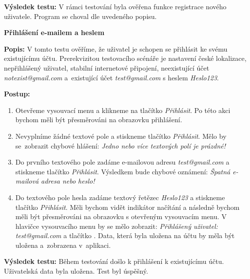 \documentclass[czech, bc, kiv, he, iso690numb]{fasthesis}
\begin{document}
\noindent \textbf{Výsledek testu:} V rámci testování byla ověřena funkce registrace nového uživatele. Program se choval dle uvedeného popisu.

\vspace{0.1cm}


\noindent \textbf{Přihlášení e-mailem a heslem}

\vspace{0.1cm}

\noindent \textbf{Popis:} V tomto testu ověříme, že uživatel je schopen se přihlásit ke svému existujícímu účtu. Prerekvizitou testovacího scénáře je nastavení české lokalizace, nepřihlášený uživatel, stabilní internetové připojení, neexistující účet \textit{notexist@gmail.com} a~existující účet \textit{test@gmail.com} s heslem \textit{Heslo123}.

\vspace{0.1cm}

\noindent \textbf{Postup:}

\begin{enumerate}[label=\arabic*., itemsep=0pt, topsep=0pt, parsep=0pt]
    \item Otevřeme vysouvací menu a klikneme na tlačítko \textit{Přihlásit}. Po této akci bychom měli být přesměrováni na obrazovku přihlášení.
    \item Nevyplníme žádné textové pole a stiskneme tlačítko \textit{Přihlásit}. Mělo by se~zobrazit chybové hlášení: \textit{Jedno nebo více textových polí je prázdné!}
    \item Do prvního textového pole zadáme e-mailovou adresu \textit{test@gmail.com} a stiskneme tlačítko \textit{Přihlásit}. Výsledkem bude chybové oznámení: \textit{Špatná e-mailová adresa nebo heslo!}
    \item Do textového pole hesla zadáme textový řetězec \textit{Heslo123} a stiskneme tlačítko \textit{Přihlásit}. Měli bychom vidět indikátor načítání a následně bychom měli být přesměrováni na obrazovku s otevřeným vysouvacím menu. V hlavičce vysouvacího menu by se mělo zobrazit: \textit{Přihlášený uživatel: test@gmail.com} a tlačítko . Data, která byla uložena na účtu by měla být uložena a~zobrazena v~aplikaci. 
\end{enumerate}

\noindent \textbf{Výsledek testu:} Během testování došlo k přihlášení k existujícímu účtu. Uživatelská data byla uložena. Test byl úspěšný.
\end{document}
